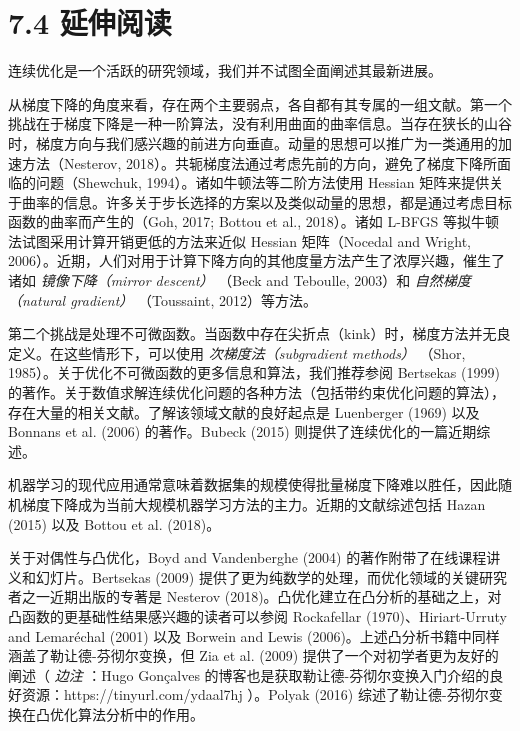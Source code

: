 \section*{7.4 延伸阅读}
\label{sec:7.4}

连续优化是一个活跃的研究领域，我们并不试图全面阐述其最新进展。

从梯度下降的角度来看，存在两个主要弱点，各自都有其专属的一组文献。第一个挑战在于梯度下降是一种一阶算法，没有利用曲面的曲率信息。当存在狭长的山谷时，梯度方向与我们感兴趣的前进方向垂直。动量的思想可以推广为一类通用的加速方法（Nesterov, 2018）。共轭梯度法通过考虑先前的方向，避免了梯度下降所面临的问题（Shewchuk, 1994）。诸如牛顿法等二阶方法使用 Hessian 矩阵来提供关于曲率的信息。许多关于步长选择的方案以及类似动量的思想，都是通过考虑目标函数的曲率而产生的（Goh, 2017; Bottou et al., 2018）。诸如 L-BFGS 等拟牛顿法试图采用计算开销更低的方法来近似 Hessian 矩阵（Nocedal and Wright, 2006）。近期，人们对用于计算下降方向的其他度量方法产生了浓厚兴趣，催生了诸如 \emph{镜像下降（mirror descent）} （Beck and Teboulle, 2003）和 \emph{自然梯度（natural gradient）} （Toussaint, 2012）等方法。

第二个挑战是处理不可微函数。当函数中存在尖折点（kink）时，梯度方法并无良定义。在这些情形下，可以使用 \emph{次梯度法（subgradient methods）} （Shor, 1985）。关于优化不可微函数的更多信息和算法，我们推荐参阅 Bertsekas (1999) 的著作。关于数值求解连续优化问题的各种方法（包括带约束优化问题的算法），存在大量的相关文献。了解该领域文献的良好起点是 Luenberger (1969) 以及 Bonnans et al. (2006) 的著作。Bubeck (2015) 则提供了连续优化的一篇近期综述。

机器学习的现代应用通常意味着数据集的规模使得批量梯度下降难以胜任，因此随机梯度下降成为当前大规模机器学习方法的主力。近期的文献综述包括 Hazan (2015) 以及 Bottou et al. (2018)。

关于对偶性与凸优化，Boyd and Vandenberghe (2004) 的著作附带了在线课程讲义和幻灯片。Bertsekas (2009) 提供了更为纯数学的处理，而优化领域的关键研究者之一近期出版的专著是 Nesterov (2018)。凸优化建立在凸分析的基础之上，对凸函数的更基础性结果感兴趣的读者可以参阅 Rockafellar (1970)、Hiriart-Urruty and Lemaréchal (2001) 以及 Borwein and Lewis (2006)。上述凸分析书籍中同样涵盖了勒让德-芬彻尔变换，但 Zia et al. (2009) 提供了一个对初学者更为友好的阐述（ \emph{边注} ：Hugo Gonçalves 的博客也是获取勒让德-芬彻尔变换入门介绍的良好资源：https://tinyurl.com/ydaal7hj ）。Polyak (2016) 综述了勒让德-芬彻尔变换在凸优化算法分析中的作用。
